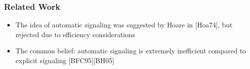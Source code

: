 \documentclass[mathserif,14pt,xcolor=table]{beamer}
\begin{document}
\begin{frame}
    \frametitle{Related Work} 
    \begin{itemize}
        \item The idea of automatic signaling was suggested 
            by Hoare in [Hoa74], but rejected due to efficiency considerations  
        \item The common belief: automatic signaling is extremely
            inefficient compared to explicit signaling [BFC95][BH05]
    \end{itemize}
\end{frame}

\end{document}
